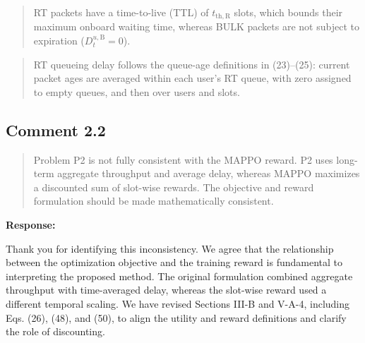 \documentclass[11pt,a4paper]{article}
\begin{document}
\begin{quote}\small\color{revisionblue}
RT packets have a time-to-live (TTL) of $t_{\mathrm{th},\mathrm{R}}$ slots, which bounds their maximum onboard waiting time, whereas BULK packets are not subject to expiration ($D_t^{u,\mathrm{B}}=0$).
\par
\end{quote}


\begin{quote}\small\color{revisionblue}
RT queueing delay follows the queue-age definitions in (23)--(25): current packet ages are averaged within each user's RT queue, with zero assigned to empty queues, and then over users and slots.
\par
\end{quote}


\subsection*{Comment 2.2}

\begin{quote}\small Problem P2 is not fully consistent with the MAPPO reward. P2 uses long-term aggregate throughput and average delay, whereas MAPPO maximizes a discounted sum of slot-wise rewards. The objective and reward formulation should be made mathematically consistent.\end{quote}

\textbf{Response:}\par

Thank you for identifying this inconsistency. We agree that the relationship between the optimization objective and the training reward is fundamental to interpreting the proposed method. The original formulation combined aggregate throughput with time-averaged delay, whereas the slot-wise reward used a different temporal scaling. We have revised Sections III-B and V-A-4, including Eqs. (26), (48), and (50), to align the utility and reward definitions and clarify the role of discounting.
\par
\end{document}
